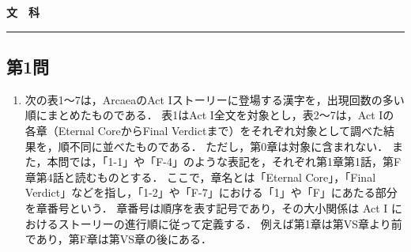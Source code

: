 \documentclass[uplatex,dvipdfmx,paper=a4paper,fontsize=11pt,jafontscale=0.9247,lang=ja]{jlreq}
\newcommand{\daimon}[1]{\subsection*{#1}}
\newcommand{\beginsubject}[1]{%
  \newpage
  \pagestyle{exampage}
  \rhead{#1}
  \begin{center}
    \vspace*{2em}
    {\LARGE\textbf{#1}}\\[0.5em]
    \rule{0.6\textwidth}{0.8pt}
  \end{center}
  \vspace{1em}
}
\begin{document}
\vfill
\beginsubject{文　科}
\daimon{第1問}
\begin{enumerate}[label=(\arabic*)]
    \item 次の表1〜7は，ArcaeaのAct $\mathrm{I}$ストーリーに登場する漢字を，出現回数の多い順にまとめたものである．
    表1はAct $\mathrm{I}$全文を対象とし，表2〜7は，Act $\mathrm{I}$の各章（Eternal CoreからFinal Verdictまで）をそれぞれ対象として調べた結果を，順不同に並べたものである．
    ただし，第0章は対象に含まれない．
    また，本問では，「1-1」や「F-4」のような表記を，それぞれ第1章第1話，第F章第4話と読むものとする．
    ここで，章名とは「Eternal Core」，「Final Verdict」などを指し，「1-2」や「F-7」における「1」や「F」にあたる部分を章番号という．
    章番号は順序を表す記号であり，その大小関係は Act $\mathrm{I}$ におけるストーリーの進行順に従って定義する．
    例えば第1章は第VS章より前であり，第F章は第VS章の後にある．
    

\end{enumerate}
\end{document}
